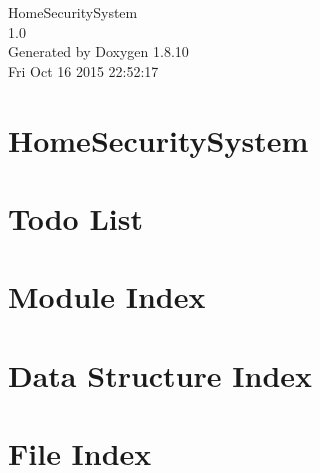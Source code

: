 \documentclass[twoside]{book}
\newcommand{\+}{\discretionary{\mbox{\scriptsize$\hookleftarrow$}}{}{}}
\newcommand{\clearemptydoublepage}{%
  \newpage{\pagestyle{empty}\cleardoublepage}%
}
\begin{document}
\hypersetup{pageanchor=false,
             bookmarks=true,
             bookmarksnumbered=true,
             pdfencoding=unicode
            }
\begin{titlepage}
\vspace*{7cm}
\begin{center}%
{\Large Home\+Security\+System \\[1ex]\large 1.\+0 }\\
\vspace*{1cm}
{\large Generated by Doxygen 1.8.10}\\
\vspace*{0.5cm}
{\small Fri Oct 16 2015 22:52:17}\\
\end{center}
\end{titlepage}
\clearemptydoublepage
\tableofcontents
\clearemptydoublepage
{}
\hypersetup{pageanchor=true}

\chapter{Home\+Security\+System}
\label{md__r_e_a_d_m_e}
\hypertarget{md__r_e_a_d_m_e}{}

\chapter{Todo List}
\label{todo}
\hypertarget{todo}{}

\chapter{Module Index}

\chapter{Data Structure Index}

\chapter{File Index}

\end{document}
